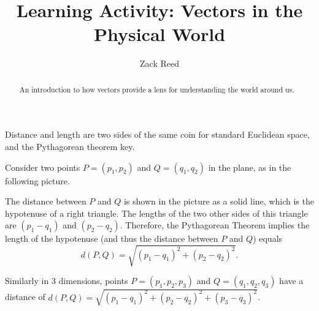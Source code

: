 \documentclass{ximera}
\author{Zack Reed}
\title{Learning Activity: Vectors in the Physical World}
\begin{document}
\begin{abstract}
    An introduction to how vectors provide a lens for understanding the world around us.
\end{abstract}
\maketitle



Distance and length are two sides of the same coin for standard Euclidean space, and the Pythagorean theorem key.

Consider two points $P=(p_1,p_2)$ and
$Q=(q_1,q_2)$ in the plane, as in the following picture.


The distance between $P$ and $Q$ is shown in the picture as a solid
line, which is the hypotenuse of a right triangle.  The lengths of the
two other sides of this triangle are $(p_1-q_1)$ and
$(p_2-q_2)$. Therefore, the Pythagorean Theorem implies the
length of the hypotenuse (and thus the distance between $P$ and $Q$)
equals
\begin{equation*}
d(P,Q)
=\sqrt{(p_1-q_1)^2+(p_2-q_2)^2}.
\end{equation*}

Similarly in 3 dimensions, points $P=(p_1,p_2,p_3)$ and
$Q = (q_1,q_2,q_3)$ have a distance of $d(P,Q)=\sqrt{(p_1-q_1)^2+(p_2-q_2)^2+(p_3-q_3)^2}$.

\end{document}
